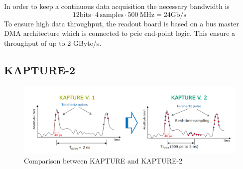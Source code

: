 In order to keep a continuous data acquisition the necessary bandwidth is 
\begin{equation}
	12 \text{bits} \cdot 4 \, \text{samples} \cdot \SI{500}{\mega \hertz} = 24 \text{Gb/s}
\end{equation}
To ensure high data throughput, the readout board is based on a bus master DMA architecture which is connected to \gls{pcie} end-point logic. This ensure a throughput of up to 2 GByte/s. \cite{caselleKAP}

\subsection{KAPTURE-2}

\begin{figure}[tbh]
	\centering
	\includegraphics[width = \textwidth]{chap/03-currentStat/img/kap1_vs_kap2}
	\caption{Comparison between KAPTURE and KAPTURE-2\cite{caselleKAP}}
	\label{fig:kap1vskap2}
\end{figure}
